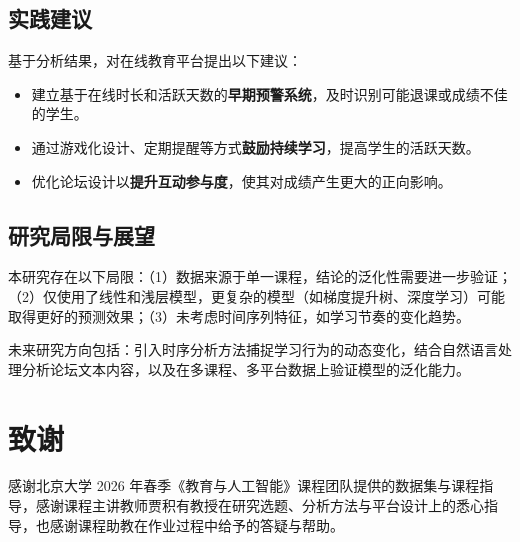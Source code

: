\documentclass[UTF8, 12pt, a4paper]{ctexart}
\begin{document}
\subsection{实践建议}

基于分析结果，对在线教育平台提出以下建议：
\begin{itemize}
    \item 建立基于在线时长和活跃天数的\textbf{早期预警系统}，及时识别可能退课或成绩不佳的学生。
    \item 通过游戏化设计、定期提醒等方式\textbf{鼓励持续学习}，提高学生的活跃天数。
    \item 优化论坛设计以\textbf{提升互动参与度}，使其对成绩产生更大的正向影响。
\end{itemize}

\subsection{研究局限与展望}

本研究存在以下局限：（1）数据来源于单一课程，结论的泛化性需要进一步验证；（2）仅使用了线性和浅层模型，更复杂的模型（如梯度提升树、深度学习）可能取得更好的预测效果；（3）未考虑时间序列特征，如学习节奏的变化趋势。

未来研究方向包括：引入时序分析方法捕捉学习行为的动态变化，结合自然语言处理分析论坛文本内容，以及在多课程、多平台数据上验证模型的泛化能力。

\section*{致谢}

感谢北京大学 2026 年春季《教育与人工智能》课程团队提供的数据集与课程指导，感谢课程主讲教师贾积有教授在研究选题、分析方法与平台设计上的悉心指导，也感谢课程助教在作业过程中给予的答疑与帮助。

\renewcommand{\refname}{参考文献}


\end{document}
